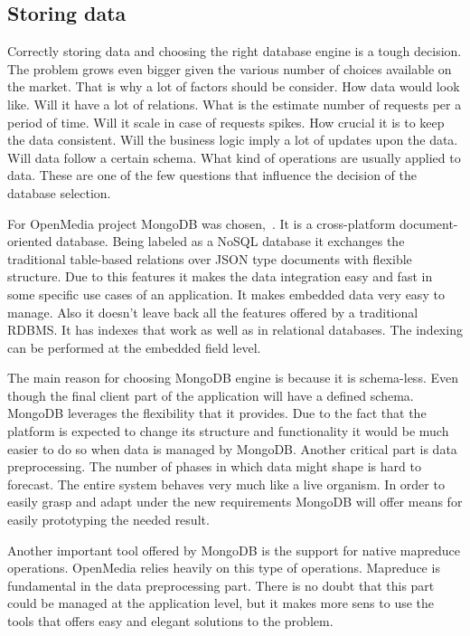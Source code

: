 \subsection{Storing data}
Correctly storing data and choosing the right database engine is a tough decision. The problem grows even bigger given the various number of choices available on the market. That is why a lot of factors should be consider. How data would look like. Will it have a lot of relations. What is the estimate number of requests per a period of time. Will it scale in case of requests spikes. How crucial it is to keep the data consistent. Will the business logic imply a lot of updates upon the data. Will data follow a certain schema. What kind of operations are usually applied to data. These are one of the few questions that influence the decision of the database selection.

For OpenMedia project MongoDB was \mbox{chosen, \cite{mongodb}}. It is a cross-platform document-oriented database. Being labeled as a NoSQL database it exchanges the traditional table-based relations over JSON type documents with flexible structure. Due to this features it makes the data integration easy and fast in some specific use cases of an application. It makes embedded data very easy to manage. Also it doesn't leave back all the features offered by a traditional RDBMS. It has indexes that work as well as in relational databases. The indexing can be performed at the embedded field level.

The main reason for choosing MongoDB engine is because it is schema-less. Even though the final client part of the application will have a defined schema. MongoDB leverages the flexibility that it provides. Due to the fact that the platform is expected to change its structure and functionality it would be much easier to do so when data is managed by MongoDB. Another critical part is data preprocessing. The number of phases in which data might shape is hard to forecast. The entire system behaves very much like a live organism. In order to easily grasp and adapt under the new requirements MongoDB will offer means for easily prototyping the needed result.

Another important tool offered by MongoDB is the support for native mapreduce operations. OpenMedia relies heavily on this type of operations. Mapreduce is fundamental in the data preprocessing part. There is no doubt that this part could be managed at the application level, but it makes more sens to use the tools that offers easy and elegant solutions to the problem.

